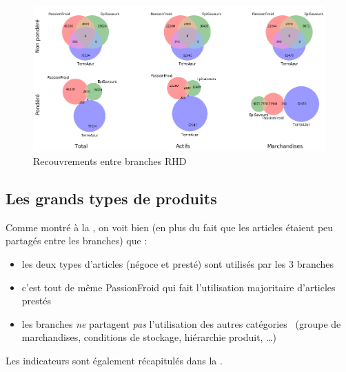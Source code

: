                 \begin{figure}[htbp]
                    \begin{center}
                    \includegraphics[width=\linewidth]{img/Diagrammes de Venn articles.png}
                    \end{center}
                    \caption{Recouvrements entre branches RHD}
                    \label{fig:venn_article}
                \end{figure}       

            \subsection{Les grands types de produits}

            Comme montré à la , on voit bien (en plus du fait que les articles étaient peu partagés entre les branches) que : 
            \begin{itemize}
                \item les deux types d'articles (négoce et presté) sont utilisés par les 3 branches
                \item c'est tout de même PassionFroid qui fait l'utilisation majoritaire d'articles prestés
                \item les branches \emph{ne} partagent \emph{pas} l'utilisation des autres \og catégories \fg\ (groupe de marchandises, conditions de stockage, hiérarchie produit, \dots)
            \end{itemize}
            Les indicateurs sont également récapitulés dans la .

